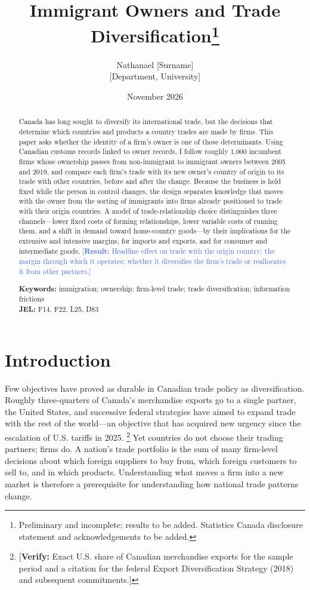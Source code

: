 \documentclass[12pt]{article}
\title{\textbf{Immigrant Owners and Trade Diversification}\thanks{%
Preliminary and incomplete; results to be added. Statistics Canada
disclosure statement and acknowledgements to be added.}}
\author{Nathanael [Surname]\\[0.2em]\normalsize [Department, University]}
\date{November 2026}
\theoremstyle{remark}
\newcommand{\result}[1]{\textcolor{RoyalBlue}{[\textbf{Result:} #1]}}
\newcommand{\verify}[1]{\textcolor{BrickRed}{[\textbf{Verify:} #1]}}
\begin{document}
\maketitle

\begin{abstract}
\noindent
Canada has long sought to diversify its international trade, but the
decisions that determine which countries and products a country trades are
made by firms. This paper asks whether the identity of a firm's owner is one
of those determinants. Using Canadian customs records linked to owner records,
I follow roughly 1,000 incumbent firms whose ownership passes from
non-immigrant to immigrant owners between 2005 and 2019, and compare each
firm's trade with its new owner's country of origin to its trade with other
countries, before and after the change. Because the business is held fixed
while the person in control changes, the design separates knowledge that moves
with the owner from the sorting of immigrants into firms already positioned to
trade with their origin countries. A model of trade-relationship choice
distinguishes three channels---lower fixed costs of forming relationships,
lower variable costs of running them, and a shift in demand toward
home-country goods---by their implications for the extensive and intensive
margins, for imports and exports, and for consumer and intermediate goods.
\result{Headline effect on trade with the origin country; the margin through
which it operates; whether it diversifies the firm's trade or reallocates it
from other partners.}

\medskip\noindent
\textbf{Keywords:} immigration; ownership; firm-level trade; trade
diversification; information frictions\\
\textbf{JEL:} F14, F22, L25, D83
\end{abstract}

\thispagestyle{empty}
\newpage
\setcounter{page}{1}

\section{Introduction}
\label{sec:intro}

Few objectives have proved as durable in Canadian trade policy as
diversification. Roughly three-quarters of Canada's merchandise exports go to
a single partner, the United States, and successive federal strategies have
aimed to expand trade with the rest of the world---an objective that has
acquired new urgency since the escalation of U.S. tariffs in 2025.%
\footnote{\verify{Exact U.S. share of Canadian merchandise exports for the
sample period and a citation for the federal Export Diversification Strategy
(2018) and subsequent commitments.}}
Yet countries do not choose their trading partners; firms do. A nation's trade
portfolio is the sum of many firm-level decisions about which foreign
suppliers to buy from, which foreign customers to sell to, and in which
products. Understanding what moves a firm into a new market is therefore a
prerequisite for understanding how national trade patterns change.
\end{document}
